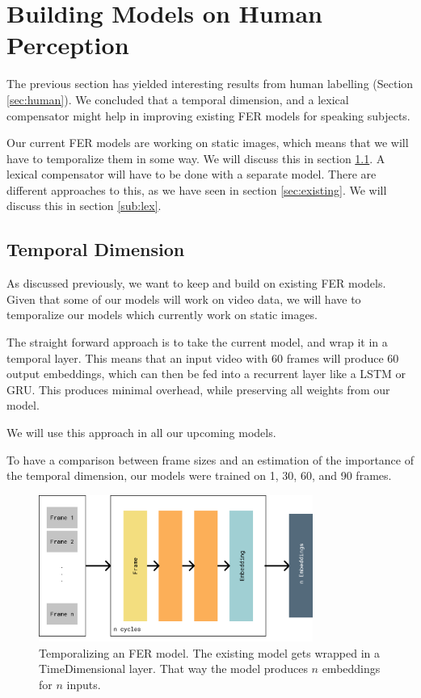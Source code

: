 \section{Building Models on Human Perception}
\label{sec:models}

The previous section has yielded interesting results from human labelling (Section \ref{sec:human}). We concluded that a temporal dimension, and a lexical compensator might help in improving existing FER models for speaking subjects. 

Our current FER models are working on static images, which means that we will have to temporalize them in some way. We will discuss this in section \ref{sub:temp}. A lexical compensator will have to be done with a separate model. There are different approaches to this, as we have seen in section \ref{sec:existing}. We will discuss this in section \ref{sub:lex}.


\subsection{Temporal Dimension}
\label{sub:temp}
As discussed previously, we want to keep and build on existing FER models. Given that some of our models will work on video data, we will have to temporalize our models which currently work on static images.

The straight forward approach is to take the current model, and wrap it in a temporal layer. This means that an input video with 60 frames will produce 60 output embeddings, which can then be fed into a recurrent layer like a LSTM or GRU. This produces minimal overhead, while preserving all weights from our model.

We will use this approach in all our upcoming models.

To have a comparison between frame sizes and an estimation of the importance of the temporal dimension, our models were trained on 1, 30, 60, and 90 frames.

\begin{figure}
    \centering
    \includegraphics[width=0.8\textwidth]{res/temporalization.pdf}
    \caption{Temporalizing an FER model. The existing model gets wrapped in a TimeDimensional layer. That way the model produces $n$ embeddings for $n$ inputs.}
    \label{fig:temporalization}
\end{figure}

